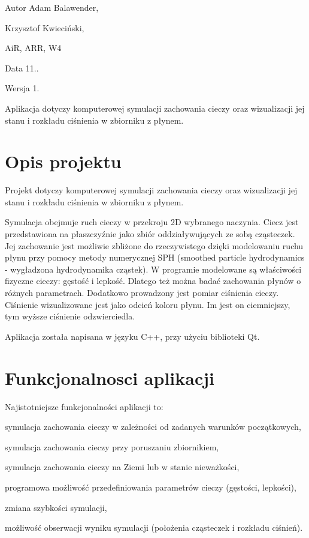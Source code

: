 \begin{DoxyAuthor}{Autor}
Adam Balawender, 

Krzysztof Kwieciński, 

Ai\-R, A\-R\-R, W4 
\end{DoxyAuthor}
\begin{DoxyDate}{Data}
11.. 
\end{DoxyDate}
\begin{DoxyVersion}{Wersja}
1.
\end{DoxyVersion}
Aplikacja dotyczy komputerowej symulacji zachowania cieczy oraz wizualizacji jej stanu i rozkładu ciśnienia w zbiorniku z płynem.\hypertarget{index_etykieta-opis-projektu}{}\section{Opis projektu}\label{index_etykieta-opis-projektu}
Projekt dotyczy komputerowej symulacji zachowania cieczy oraz wizualizacji jej stanu i rozkładu ciśnienia w zbiorniku z płynem.

Symulacja obejmuje ruch cieczy w przekroju 2\-D wybranego naczynia. Ciecz jest przedstawiona na płaszczyźnie jako zbiór oddziaływujących ze sobą cząsteczek. Jej zachowanie jest możliwie zbliżone do rzeczywistego dzięki modelowaniu ruchu płynu przy pomocy metody numerycznej S\-P\-H (smoothed particle hydrodynamics -\/ wygładzona hydrodynamika cząstek). W programie modelowane są właściwości fizyczne cieczy\-: gęstość i lepkość. Dlatego też można badać zachowania płynów o różnych parametrach. Dodatkowo prowadzony jest pomiar ciśnienia cieczy. Ciśnienie wizualizowane jest jako odcień koloru płynu. Im jest on ciemniejszy, tym wyższe ciśnienie odzwierciedla.

Aplikacja została napisana w języku C++, przy użyciu biblioteki Qt.\hypertarget{index_etykieta-funkcjonalnosci-aplikacji}{}\section{Funkcjonalnosci aplikacji}\label{index_etykieta-funkcjonalnosci-aplikacji}
Najistotniejsze funkcjonalności aplikacji to\-:
\begin{DoxyItemize}
\item symulacja zachowania cieczy w zależności od zadanych warunków początkowych,
\item symulacja zachowania cieczy przy poruszaniu zbiornikiem,
\item symulacja zachowania cieczy na Ziemi lub w stanie nieważkości,
\item programowa możliwość przedefiniowania parametrów cieczy (gęstości, lepkości),
\item zmiana szybkości symulacji,
\item możliwość obserwacji wyniku symulacji (położenia cząsteczek i rozkładu ciśnień).
\end{DoxyItemize}

